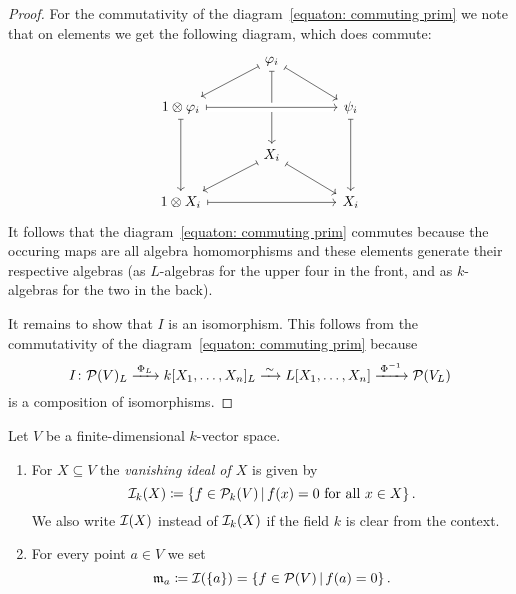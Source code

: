 \begin{proof}
    For the commutativity of the diagram~\eqref{equaton: commuting prim} we note that on elements we get the following diagram, which does commute:
    \[
      \begin{tikzcd}[column sep = large]
          {}
        & \varphi_i
          \arrow[mapsto]{dl}
          \arrow[mapsto]{dr}
          \arrow[mapsto]{dd}
        & {}
        \\
          1 \tensor \varphi_i
          \arrow[crossing over, mapsto]{rr}
          \arrow[mapsto]{dd}
        & {}
        & \psi_i
          \arrow[mapsto]{dd}
        \\
          {}
        & X_i
          \arrow[mapsto]{dl}
          \arrow[mapsto]{dr}
        & {}
        \\
          1 \tensor X_i
          \arrow[mapsto]{rr}
        & {}
        & X_i
      \end{tikzcd}
    \]
    It follows that the diagram~\eqref{equaton: commuting prim} commutes because the occuring maps are all algebra homomorphisms and these elements generate their respective algebras (as $L$-algebras for the upper four in the front, and as $k$-algebras for the two in the back).
    
    It remains to show that $I$ is an isomorphism.
    This follows from the commutativity of the diagram~\eqref{equaton: commuting prim} because
    \[
                                  I
      \colon                      \mathcal{P}(V)_L
      \xrightarrow{\,\Phi_L\,}    k[X_1, \dotsc, X_n]_L
      \xrightarrow{\,\sim\,}      L[X_1, \dotsc, X_n]
      \xrightarrow{\,\Phi^{-1}\,} \mathcal{P}(V_L)
    \]
    is a composition of isomorphisms.
\end{proof}


\begin{definition}
  \label{definition: vanishing ideal}
  Let $V$ be a finite-dimensional $k$-vector space.
  \begin{enumerate}
    \item
      For $X \subseteq V$ the \emph{vanishing ideal of $X$} is given by
      \[
        \mc{I}_k(X)
        \defined  \{
                    f \in \mc{P}_k(V)
                  \suchthat
                    \text{$f(x) = 0$ for all $x \in X$}
                  \} \,.
      \]
      We also write $\mathcal{I}(X)$ instead of $\mathcal{I}_k(X)$ if the field $k$ is clear from the context.
    \item
      For every point $a \in V$ we set
      \[
                  \mf{m}_a
        \defined  \mc{I}(\{a\})
        =         \{
                    f \in \mc{P}(V)
                  \suchthat
                    f(a) = 0
                  \} \,.
      \]
  \end{enumerate}
\end{definition}


